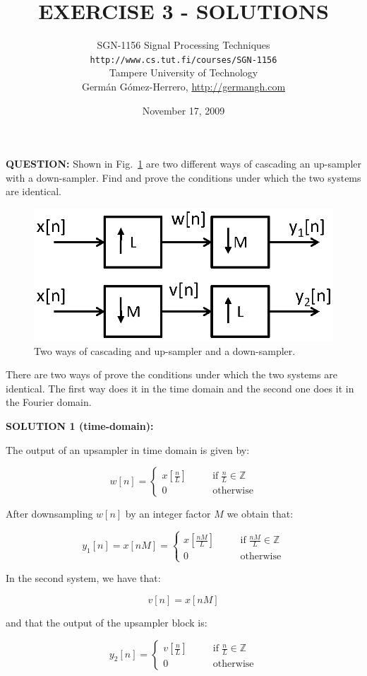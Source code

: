 \documentclass[a4paper,11pt,oneside]{article}
\title{\large{\textbf{EXERCISE 3 - SOLUTIONS}}}
\author{SGN-1156 Signal Processing Techniques\\
\texttt{http://www.cs.tut.fi/courses/SGN-1156}\\
Tampere University of Technology\\
Germ\'an G\'omez-Herrero, \url{http://germangh.com}}
\date{November 17, 2009}
\begin{document}
\maketitle

\textbf{QUESTION:} Shown in Fig.~\ref{fig1} are two different ways of cascading an up-sampler with a down-sampler. Find and prove the conditions under which the two systems are identical. 



\begin{figure}[h!]
\centering
\includegraphics[width=.5\textwidth]{fig3.eps}
\caption{Two ways of cascading and up-sampler and a down-sampler.}
\label{fig1}
\end{figure}

\vspace{1cm}

There are two ways of prove the conditions under which the two systems are identical. The first way does it in the time domain and the second one does it in the Fourier domain. 

\textbf{SOLUTION 1 (time-domain):}

The output of an upsampler in time domain is given by:

\[
w[n] = \left\{
\begin{array}{lll}
x[\frac{n}{L}] & \quad& \textrm{if}\; \frac{n}{L} \in \mathbb{Z}\\
0 &\quad& \textrm{otherwise}
\end{array}
\right.
\]

After downsampling $w[n]$ by an integer factor $M$ we obtain that:

\[
y_1[n]=x[nM]=\left\{
\begin{array}{lll}
x[\frac{nM}{L}] & \quad& \textrm{if}\; \frac{nM}{L} \in \mathbb{Z}\\
0 &\quad& \textrm{otherwise}
\end{array}
\right.
\]

In the second system, we have that:

\[
v[n] = x[nM]
\]

and that the output of the upsampler block is:

\[
y_2[n] = \left\{
\begin{array}{lll}
v[\frac{n}{L}] & \quad& \textrm{if}\; \frac{n}{L} \in \mathbb{Z}\\
0 &\quad& \textrm{otherwise}
\end{array}
\right.
\]
\end{document}
